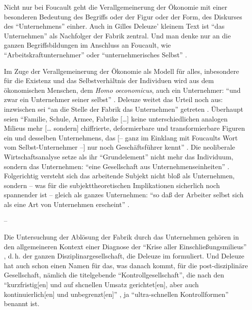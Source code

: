 \documentclass[12pt,
               DIV13,
               paper=a4,
               twoside=false,
               onehalfspacing,
               bibliography=totoc,
               toc=graduated,
               draft,
               ]{scrartcl}
\newcommand{\lips}{\dots\unkern}
\newcommand{\tit}[1]{\textit{#1}}
\newcommand{\pc}[2]{\parencite[#1]{#2}}
\newcommand{\worries}[1]{\ifdraft{\textcolor{blue}{\texttt{(#1)}}}{}}
\newcommand{\hoe}{\tit{Homo oeconomicus}\xspace}
\begin{document}
Nicht nur bei Foucault geht die Verallgemeinerung der Ökonomie mit
einer besonderen Bedeutung des Begriffs oder der Figur oder der Form,
des Diskurses des "`Unternehmens"' einher. Auch in Gilles Deleuze'
kleinem Text  \pc{}{ps} ist "`das Unternehmen"' als
Nachfolger der Fabrik zentral. Und man denke nur an die ganzen
Begriffsbildungen im Anschluss an Foucault, wie
"`Arbeitskraftunternehmer"' oder "`unternehmerisches Selbst"'
\worries{?}.

Im Zuge der Verallgemeinerung der Ökonomie als Modell für alles,
inbesondere für die Existenz und das Selbstverhältnis der Individuen
wird aus dem ökonomischen Menschen, dem \hoe, auch ein Unternehmer:
"`und zwar ein Unternehmer seiner selbst"' \pc{314}{gbp}. Deleuze
weitet das Urteil noch aus: inzwischen sei "`an die Stelle der Fabrik
das Unternehmen"' getreten \pc{256}{ps}. Überhaupt seien "`Familie,
Schule, Armee, Fabrike [\lips] keine unterschiedlichen analogen
Milieus mehr [\lips{} sondern] chiffrierte, deformierbare und
transformierbare Figuren ein und desselben Unternehmens, das [-- ganz
im Einklang mit Foucaults Wort vom Selbst-Unternehmer --] nur noch
Geschäftsführer kennt"' \pc{260}{ps}. Die neoliberale
Wirtschaftsanalyse setze als ihr "`Grundelement"' \pc{313}{gbp} nicht
mehr das Individuum, sondern das Unternehmen: "`eine Gesellschaft aus
Unternehmenseinheiten"' \pc{313}{gbp}. Folgerichtig versteht sich das
arbeitende Subjekt nicht bloß als Unternehmen, sondern -- was für die
subjekttheoretischen Implikationen sicherlich noch spannender ist --
gleich als ganzes Unternehmen: "`so daß der Arbeiter selbst sich als
eine Art von Unternehmen erscheint"' \pc{313}{gbp}.

--

Die Untersuchung der Ablösung der Fabrik durch das Unternehmen gehören
in den allgemeineren Kontext einer Diagnose der "`Krise aller
Einschließungsmilieus"' \pc{255}{ps}, d.\,h. der ganzen
Disziplinargesellschaft, die Deleuze im  formuliert. Und
Deleuze hat auch schon einen Namen für das, was danach kommt, für die
post-disziplinäre Gesellschaft, nämlich die titelgebende
"`Kontrollgesellschaft"', die nach den "`kurzfristig[en] und auf
shcnellen Umsatz gerichtet[en], aber auch kontinuierlich[en] und
unbegrenzt[en]"' \pc{260}{ps}, ja "`ultra-schnellen Kontrollformen"'
\pc{255}{ps} benannt ist.
\end{document}
